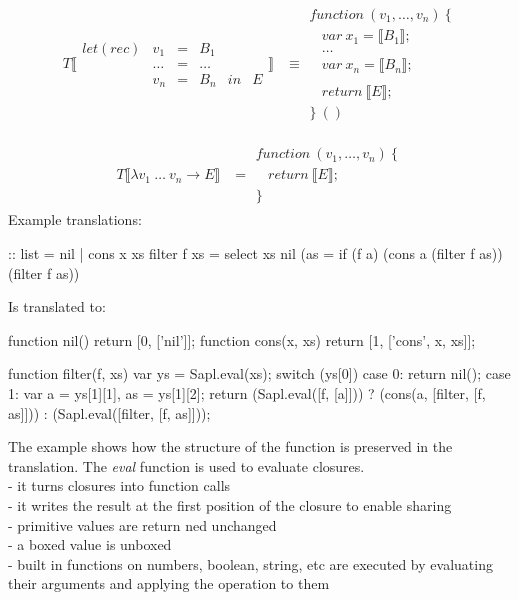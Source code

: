 \begin{align*}
T\llbracket \begin{array}{cccccc}
let(rec) & v_1    & = & B_1    &    & \\
         & \ldots & = & \ldots &    & \\
         & v_n    & = & B_n    & in & E
\end{array} \rrbracket &\equiv \begin{array}{l}
function\ (v_1, \ldots, v_n)\ \{ \\
\ \ \ \ var\ x_1 = \llbracket B_1 \rrbracket; \\
\ \ \ \ \ldots \\
\ \ \ \ var\ x_n = \llbracket B_n \rrbracket; \\
\\
\ \ \ \ return\ \llbracket E \rrbracket; \\
\}\ ()
\end{array}
\end{align*}

\begin{align*}
T\llbracket \lambda v_1 \: \ldots \: v_n \rightarrow E \rrbracket &= \begin{array}{l}
function\ (v_1, \ldots, v_n)\ \{ \\
\ \ \ \ return\ \llbracket E \rrbracket; \\
\}
\end{array}
\end{align*}
%
Example translations:
\begin{CleanCode}
:: list = nil | cons x xs	
filter f xs = select xs nil (\a as = if (f a) (cons a (filter f as)) (filter f as))
\end{CleanCode}
%
Is translated to:
\begin{CleanCode}
function nil() {return [0, ['nil']];}
function cons(x, xs) {return [1, ['cons', x, xs]];}

function filter(f, xs) {
    var ys = Sapl.eval(xs);
    switch (ys[0]) {
    case 0:
        return nil();
    case 1:
        var a = ys[1][1],
            as = ys[1][2];
        return (Sapl.eval([f, [a]])) ? (cons(a, [filter, [f, as]])) : 
                                       (Sapl.eval([filter, [f, as]]));
    }
}\end{CleanCode}
The example shows how the structure of the function is preserved in the translation.
The \emph{eval} function is used to evaluate closures.\\
- it turns closures into function calls\\
- it writes the result at the first position of the closure to enable sharing\\
- primitive values are return ned unchanged\\
- a boxed value is unboxed\\
- built in functions on numbers, boolean, string, etc are executed by evaluating their arguments and applying the operation to them


